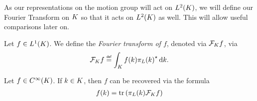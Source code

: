 As our representations on the motion group will act on $\Lebesgue{2}\CompactGroup$,
we will define our Fourier Transform on $\CompactGroup$ so that it acts on $\Lebesgue{2}\CompactGroup$ as well.
This will allow useful comparisons later on.

\begin{definition}
    Let $f \in \Lebesgue{1}\CompactGroup$.
    We define the \emph{Fourier transform of $f$}, denoted via $\Fourier[\CompactGroup] f$, via
    \begin{align*}
        \Fourier[\CompactGroup] f \defeq \int_\CompactGroup f(k) \adj{\pi_L(k)} \dd k.
    \end{align*}
\end{definition}

\begin{proposition}
    Let $f \in \SmoothFunctions\CompactGroup$.
    If $k \in \CompactGroup$,
    then $f$ can be recovered via the formula
    \begin{align*}
        f(k) = \tr\left(\pi_L(k) \Fourier[\CompactGroup] f \right)
    \end{align*}
\end{proposition}

